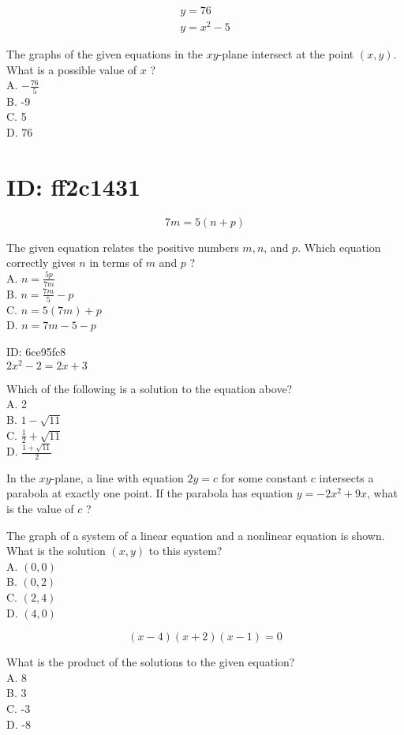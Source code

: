 $$
\begin{gathered}
y=76 \\
y=x^{2}-5
\end{gathered}
$$

The graphs of the given equations in the $x y$-plane intersect at the point $(x, y)$. What is a possible value of $x$ ?\\
A. $-\frac{76}{5}$\\
B. -9\\
C. 5\\
D. 76

\section*{ID: ff2c1431}
$$
7 m=5(n+p)
$$

The given equation relates the positive numbers $m, n$, and $p$. Which equation correctly gives $n$ in terms of $m$ and $p$ ?\\
A. $n=\frac{5 p}{7 m}$\\
B. $n=\frac{7 m}{5}-p$\\
C. $n=5(7 m)+p$\\
D. $n=7 m-5-p$

ID: 6ce95fc8\\
$2 x^{2}-2=2 x+3$

Which of the following is a solution to the equation above?\\
A. 2\\
B. $1-\sqrt{11}$\\
C. $\frac{1}{2}+\sqrt{11}$\\
D. $\frac{1+\sqrt{11}}{2}$

In the $x y$-plane, a line with equation $2 y=c$ for some constant $c$ intersects a parabola at exactly one point. If the parabola has equation $y=-2 x^{2}+9 x$, what is the value of $c$ ?\\


The graph of a system of a linear equation and a nonlinear equation is shown. What is the solution $(x, y)$ to this system?\\
A. $(0,0)$\\
B. $(0,2)$\\
C. $(2,4)$\\
D. $(4,0)$

$$
(x-4)(x+2)(x-1)=0
$$

What is the product of the solutions to the given equation?\\
A. 8\\
B. 3\\
C. -3\\
D. -8

